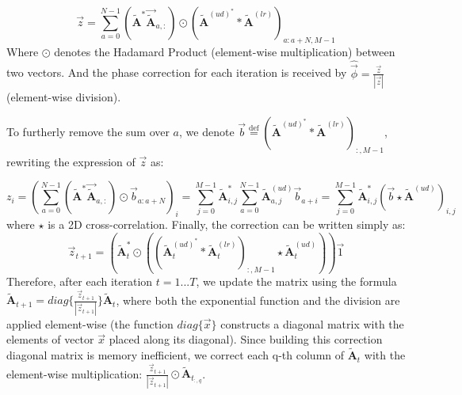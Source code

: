 \documentclass[pdflatex,sn-mathphys-num,Numbered]{sn-jnl}%
\theoremstyle{thmstyleone}%
\theoremstyle{thmstyletwo}%
\theoremstyle{thmstylethree}%
\begin{document}
\begin{equation}
\vec{z}=\sum^{N-1}_{a=0}(\tilde{\textbf{A}}^*\vec{\tilde{\textbf{A}}}_{a,:})\odot(\tilde{\textbf{A}}^{(ud)^*}*\tilde{\textbf{A}}^{(lr)})_{a:a+N,M-1}
\label{eq:11} \tag{S11}
\end{equation}
Where $\odot$ denotes the Hadamard Product (element-wise multiplication) between two vectors. And the phase correction for each iteration is received by $\hat{\vec{\phi}} = \frac{\vec{z}}{|\vec{z}|}$ (element-wise division).

To furtherly remove the sum over $a$, we denote $\vec{b}\stackrel{\text{def}} = (\tilde{\textbf{A}}^{(ud)^*}*\tilde{\textbf{A}}^{(lr)})_{:,M-1}$, rewriting the expression of $\vec{z}$ as:

\begin{equation}
z_i=(\sum^{N-1}_{a=0}(\tilde{\textbf{A}}^*\vec{\tilde{\textbf{A}}}_{a,:})\odot\vec{b}_{a:a+N})_i =\sum^{M-1}_{j=0} \tilde{\textbf{A}}^*_{i,j}\sum^{N-1}_{a=0}\tilde{\textbf{A}}^{(ud)}_{a,j}\vec{b}_{a+i}=\sum^{M-1}_{j=0} \tilde{\textbf{A}}^*_{i,j}(\vec{b} \star \tilde{\textbf{A}}^{(ud)})_{i,j}
\label{eq:12}  \tag{S12}
\end{equation}
where $\star$ is a 2D cross-correlation.
Finally, the correction can be written simply as:
\begin{equation}
\vec{z}_{t+1}=(\tilde{\textbf{A}}_t^* \odot ((\tilde{\textbf{A}}_t^{(ud)^*}*\tilde{\textbf{A}}_t^{(lr)})_{:,M-1} \star \tilde{\textbf{A}}_t^{(ud)}))\vec{1}
\label{eq:13}  \tag{S13}
\end{equation}
Therefore, after each iteration $t = 1...T$, we update the matrix using the formula
$\tilde{\textbf{A}}_{t+1}=diag\{\frac{\vec{z}_{t+1}}{|\vec{z}_{t+1}|}\}\tilde{\textbf{A}}_t$, where both the exponential function and the division are applied element-wise  (the function $diag\{\vec{x}\}$ constructs a diagonal matrix with the elements of vector $\vec{x}$ placed along its diagonal).
Since building this correction diagonal matrix is memory inefficient, we correct each q-th column of $\tilde{\textbf{A}}_t$ with the element-wise multiplication: $ \frac{\vec{z}_{t+1}}{|\vec{z}_{t+1}|} \odot \tilde{\textbf{A}}_{t_{:,q}}$.
\end{document}
